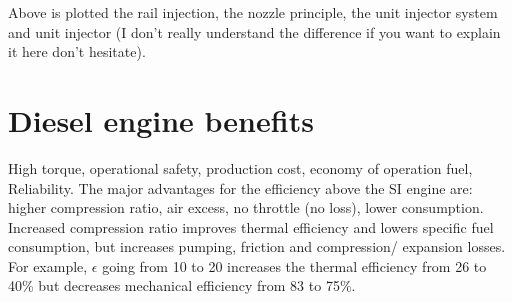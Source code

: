 	Above is plotted the rail injection, the nozzle principle, the unit injector system and unit injector (I don't really understand the difference if you want to explain it here don't hesitate). 
	
\section{Diesel engine benefits}
	High torque, operational safety, production cost, economy of operation fuel, Reliability. The major advantages for the efficiency above the SI engine are: higher compression ratio, air excess, no throttle (no loss), lower consumption. Increased compression ratio improves thermal efficiency and lowers specific fuel consumption, but increases pumping, friction and compression/ expansion losses. For example, $\epsilon$ going from 10 to 20 increases the thermal efficiency from 26 to 40\% but decreases mechanical efficiency from 83 to 75\%.
	
